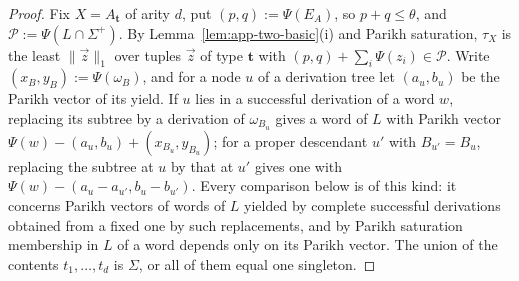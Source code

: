 \documentclass[11pt]{article}
\numberwithin{equation}{section}
\theoremstyle{plain}
\theoremstyle{definition}
\theoremstyle{remark}
\newcommand{\tuple}[1]{\vec{#1}}
\theoremstyle{plain}
\begin{document}
\begin{proof}
Fix $X=A_{\mathbf t}$ of arity $d$, put $(p,q):=\Psi(E_A)$, so $p+q\le\theta$, and
$\mathcal P:=\Psi(L\cap\Sigma^+)$.  By Lemma~\ref{lem:app-two-basic}(i) and Parikh
saturation, $\tau_X$ is the least $\|\tuple z\|_1$ over tuples $\tuple z$ of type
$\mathbf t$ with $(p,q)+\sum_i\Psi(z_i)\in\mathcal P$.  Write $(x_B,y_B):=\Psi(\omega_B)$,
and for a node $u$ of a derivation tree let $(a_u,b_u)$ be the Parikh vector of
its yield.  If $u$ lies in a successful derivation of a word $w$, replacing its
subtree by a derivation of $\omega_{B_u}$ gives a word of $L$ with Parikh vector
$\Psi(w)-(a_u,b_u)+(x_{B_u},y_{B_u})$; for a proper descendant $u'$ with
$B_{u'}=B_u$, replacing the subtree at $u$ by that at $u'$ gives one with
$\Psi(w)-(a_u-a_{u'},b_u-b_{u'})$.  Every comparison below is of this kind: it
concerns Parikh vectors of words of $L$ yielded by complete successful
derivations obtained from a fixed one by such replacements, and by Parikh
saturation membership in $L$ of a word depends only on its Parikh vector.  The union of the contents $t_1,\dots,t_d$ is
$\Sigma$, or all of them equal one singleton.


\end{proof}
\end{document}
